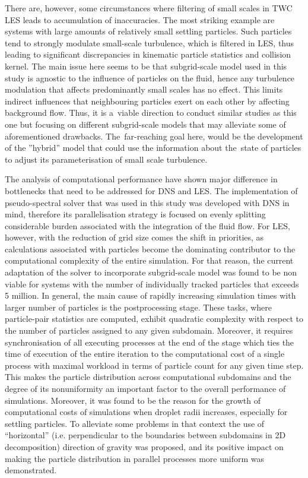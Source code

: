 \documentclass{pracamgren}
\begin{document}
There are, however, some circumstances where filtering of small scales in TWC LES leads to accumulation of inaccuracies.
The most striking example are systems with large amounts of relatively small settling particles.
Such particles tend to strongly modulate small-scale turbulence, which is filtered in LES, thus leading to significant discrepancies in kinematic particle statistics and collision kernel.
The main issue here seems to be that subgrid-scale model used in this study is agnostic to the influence of particles on the fluid, hence any turbulence modulation that affects predominantly small scales has no effect.
This limits indirect influences that neighbouring particles exert on each other by affecting background flow.
Thus, it is a~viable direction to conduct similar studies as this one but focusing on different subgrid-scale models that may alleviate some of aforementioned drawbacks.
The~far-reaching goal here, would be the development of the ''hybrid'' model that could use the information about the~state of particles to adjust its parameterisation of small scale turbulence.

The analysis of computational performance have shown major difference in bottlenecks that need to be addressed for DNS and LES.
The implementation of pseudo-spectral solver that was used in this study was developed with DNS in mind, therefore its parallelisation strategy is focused on evenly splitting considerable burden associated with the integration of the fluid flow.
For LES, however, with the reduction of grid size comes the shift in priorities, as calculations associated with particles become the dominating contributor to the computational complexity of the entire simulation.
For that reason, the current adaptation of the solver to incorporate subgrid-scale model was found to be non viable for systems with the number of individually tracked particles that exceeds 5 million.
In general, the main cause of rapidly increasing simulation times with larger number of particles is the postprocessing stage.
These tasks, where particle-pair statistics are computed, exhibit quadratic complexity with respect to the number of particles assigned to any given subdomain.
Moreover, it requires synchronisation of all executing processes at the end of the stage which ties the time of execution of the entire iteration to the computational cost of a single process with maximal workload in terms of particle count for any given time step.
This makes the particle distribution across computational subdomains and the degree of its nonuniformity an important factor to the overall performance of simulations.
Moreover, it was found to be the reason for the growth of computational costs of simulations when droplet radii increases, especially for settling particles.
To alleviate some problems in that context the use of ``horizontal'' (i.e. perpendicular to the boundaries between subdomains in 2D decomposition) direction of gravity was proposed, and its positive impact on making the particle distribution in parallel processes more uniform was demonstrated.
\end{document}
